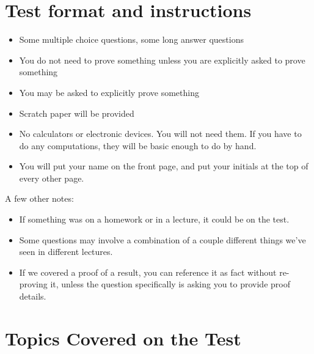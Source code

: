 \documentclass[11  pt]{exam}
\begin{document}
	
	
	
	
	\section{Test format and instructions}
	
	\begin{itemize}
		\item Some multiple choice questions, some long answer questions
		\item You do not need to prove something unless you are explicitly asked to prove something
		\item You may be asked to explicitly prove something 
		\item Scratch paper will be provided
		\item No calculators or electronic devices. You will not need them. If you have to do any computations, they will be basic enough to do by hand. 
		\item You will put your name on the front page, and put your initials at the top of every other page.
	\end{itemize}
	
	
	A few other notes:
	\begin{itemize}
		\item If something was on a homework or in a lecture, it could be on the test.
		\item Some questions may involve a combination of a couple different things we've seen in different lectures.
		\item If we covered a proof of a result, you can reference it as fact without re-proving it, unless the question specifically is asking you to provide proof details.
	\end{itemize}
	
	\newpage 
	
	\section{Topics Covered on the Test}
	
\end{document}
